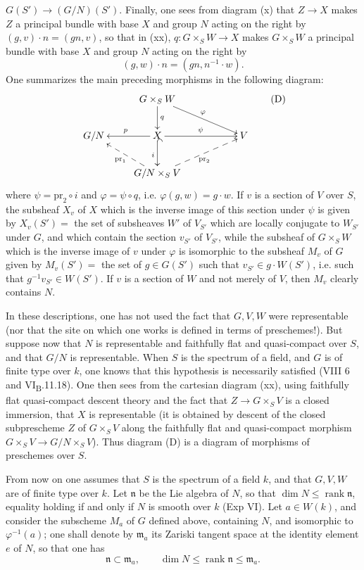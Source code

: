 $G(S')\to(G/N)(S')$. Finally, one sees from diagram (x) that $Z\to X$ makes
$Z$ a principal bundle with base $X$ and group $N$ acting on the right by
$(g,v)\cdot n=(gn,v)$, so that in (xx), $q:G\times_S W\to X$ makes
$G\times_S W$ a principal bundle with base $X$ and group $N$ acting on the
right by
\[
 (g,w)\cdot n=(gn,n^{-1}\cdot w).
\]
One summarizes the main preceding morphisms in the following diagram:
\[
\xymatrix@C=2.4em@R=2.2em{
 &G\times_S W\ar[d]^q\ar[drr]^\varphi&&\\
 G/N&X\ar[l]_p\ar[rr]^\psi\ar@{^{(}->}[d]_i&&V\\
 &G/N\times_S V\ar@{-->}[ul]^{\mathrm{pr}_1}\ar@{-->}[urr]_{\mathrm{pr}_2}&&
}\tag{D}
\]
where $\psi=\mathrm{pr}_2\circ i$ and $\varphi=\psi\circ q$, i.e.
$\varphi(g,w)=g\cdot w$. If $v$ is a section of $V$ over $S$, the subsheaf
$X_v$ of $X$ which is the inverse image of this section under $\psi$ is given
by $X_v(S')=$ the set of subsheaves $W'$ of $V_{S'}$ which are locally
conjugate to $W_{S'}$ under $G$, and which contain the section $v_{S'}$ of
$V_{S'}$, while the subsheaf of $G\times_S W$ which is the inverse image of
$v$ under $\varphi$ is isomorphic to the subsheaf $M_v$ of $G$ given by
$M_v(S')=$ the set of $g\in G(S')$ such that $v_{S'}\in g\cdot W(S')$, i.e.
such that $g^{-1}v_{S'}\in W(S')$. If $v$ is a section of $W$ and not merely
of $V$, then $M_v$ clearly contains $N$.

In these descriptions, one has not used the fact that $G,V,W$ were
representable (nor that the site on which one works is defined in terms of
preschemes!). But suppose now that $N$ is representable and faithfully flat
and quasi-compact over $S$, and that $G/N$ is representable. When $S$ is the
spectrum of a field, and $G$ is of finite type over $k$, one knows that this
hypothesis is necessarily satisfied (VIII 6 and VI\textsubscript{B}.11.18).
One then sees from the cartesian diagram (xx), using faithfully flat
quasi-compact descent theory and the fact that $Z\to G\times_S V$ is a closed
immersion, that $X$ is representable (it is obtained by descent of the closed
subprescheme $Z$ of $G\times_S V$ along the faithfully flat and quasi-compact
morphism $G\times_S V\to G/N\times_S V$). Thus diagram (D) is a diagram of
morphisms of preschemes over $S$.

From now on one assumes that $S$ is the spectrum of a field $k$, and that
$G,V,W$ are of finite type over $k$. Let $\mathfrak n$ be the Lie algebra of
$N$, so that $\dim N\leq\operatorname{rank}\mathfrak n$, equality holding if
and only if $N$ is smooth over $k$ (Exp VI).
Let $a\in W(k)$, and consider the subscheme $M_a$ of $G$ defined above,
containing $N$, and isomorphic to $\varphi^{-1}(a)$; one shall denote by
$\mathfrak m_a$ its Zariski tangent space at the identity element $e$ of $N$,
so that one has
\[
 \mathfrak n\subset\mathfrak m_a,\qquad
 \dim N\leq\operatorname{rank}\mathfrak n\leq\mathfrak m_a.\tag{1}
\]

